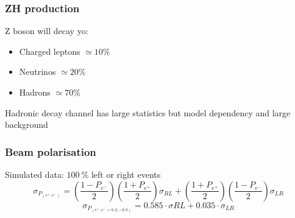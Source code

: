 \documentclass{beamer}
\begin{document}

  \begin{frame}[plain]
    \frametitle{ZH production}

    Z boson will decay yo:
    \begin{itemize}
        \item Charged leptons $\simeq 10 \%$
        \item Neutrinos $\simeq 20 \%$
        \item Hadrons $\simeq 70\%$
    \end{itemize}

    Hadronic decay channel has large statistics but model dependency and large background
  \end{frame}




  \begin{frame}[plain]
    \frametitle{Beam polarisation}

    \begin{block}{Simulated data: $100~\%$ left or right events}
      \footnotesize{
      \[ \sigma_{P_{(e^+,e^-)}} = \left( \frac{1-P_{e^-}}{2} \right) \left( \frac{1+P_{e^+}}{2} \right) \sigma_{RL} + \left( \frac{1+P_{e^+}}{2} \right) \left( \frac{1-P_{e^-}}{2} \right) \sigma_{LR} \]
      \[ \sigma_{P_{(e^+,e^- = 0.3, -0.8)}} = 0.585 \cdot \sigma{RL} + 0.035 \cdot \sigma_{LR} \]
      }
    \end{block}
  \end{frame}


\end{document}
